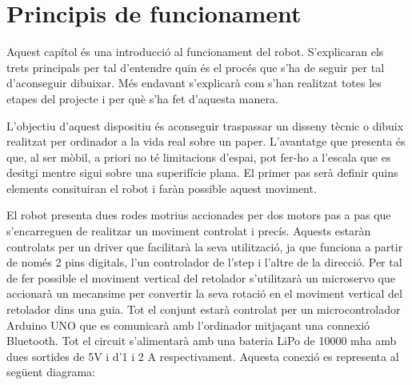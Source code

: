 \setlength\topmargin{8mm}
\onehalfspacing
\chapter{Principis de funcionament} %

\label{Chapter2} %






Aquest capítol és una introducció al funcionament del robot. S'explicaran els trets principals per tal d'entendre quin és el procés que s'ha de seguir per tal d'aconseguir dibuixar. Més endavant s'explicarà com s'han realitzat totes les etapes del projecte i per què s'ha fet d'aquesta manera. 

L'objectiu d'aquest dispositiu és aconseguir traspassar un disseny tècnic o dibuix realitzat per ordinador a la vida real sobre un paper. L'avantatge que presenta és que, al ser mòbil, a priori no té limitacions d'espai, pot fer-ho a l'escala que es desitgi mentre sigui sobre una superifície plana. El primer pas serà definir quins elements consituiran el robot i faràn possible aquest moviment. 

El robot presenta dues rodes motrius accionades per dos motors pas a pas que s'encarreguen de realitzar un moviment controlat i precís. Aquests estaràn controlats per un driver que facilitarà la seva utilització, ja que funciona a partir de només 2 pins digitals, l'un controlador de l'step i l'altre de la direcció. Per tal de fer possible el moviment vertical del retolador s'utilitzarà un microservo que accionarà un mecansime per convertir la seva rotació en el moviment vertical del retolador dins una guia. Tot el conjunt estarà controlat per un microcontrolador Arduino UNO que es comunicarà amb l'ordinador mitjaçant una connexió Bluetooth. Tot el circuit s'alimentarà amb una bateria LiPo de 10000 mha amb dues sortides de 5V i d'1 i 2 A respectivament. Aquesta conexió es representa al següent diagrama:

